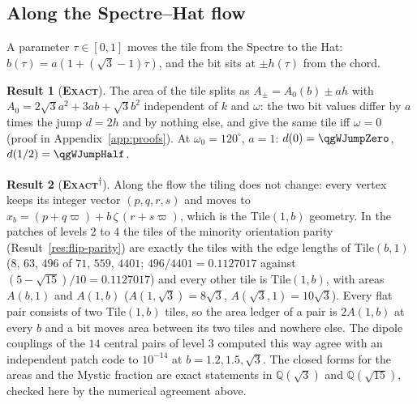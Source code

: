 \documentclass[11pt]{article}
\newcommand{\exact}{\textbf{\textsc{Exact}}}
\newcommand{\snap}{\textsuperscript{$\dagger$}}      %
\theoremstyle{definition}
\newtheorem{result}{Result}
\begin{document}
\subsection{Along the Spectre--Hat flow}\label{sec:flow}
A parameter $\tau\in[0,1]$ moves the tile from the Spectre to the Hat: $b(\tau)=a(1+(\sqrt3-1)\tau)$, and the bit sits at $\pm h(\tau)$ from the chord.
\begin{result}[\exact]\label{res:flow-area}
The area of the tile splits as $A_\pm=A_0(b)\pm ah$ with $A_0=2\sqrt3a^2+3ab+\sqrt3b^2$ independent of $k$ and $\omega$: the two bit values differ by $a$ times the jump $d=2h$ and by nothing else, and give the same tile iff $\omega=0$ (proof in Appendix~\ref{app:proofs}). At $\omega_0=120^\circ$, $a=1$: $d(0)=\qgWJumpZero$, $d(1/2)=\qgWJumpHalf$.
\end{result}
\begin{result}[\exact\snap]\label{res:flow-patch}
Along the flow the tiling does not change: every vertex keeps its integer vector $(p,q,r,s)$ and moves to $x_b=(p+q\varpi)+b\,\zeta\,(r+s\varpi)$, which is the Tile$(1,b)$ geometry. In the patches of levels $2$ to $4$ the tiles of the minority orientation parity (Result~\ref{res:flip-parity}) are exactly the tiles with the edge lengths of Tile$(b,1)$ ($8$, $63$, $496$ of $71$, $559$, $4401$; $496/4401=0.1127017$ against $(5-\sqrt{15})/10=0.1127017$) and every other tile is Tile$(1,b)$, with areas $A(b,1)$ and $A(1,b)$ ($A(1,\sqrt3)=8\sqrt3$, $A(\sqrt3,1)=10\sqrt3$). Every flat pair consists of two Tile$(1,b)$ tiles, so the area ledger of a pair is $2A(1,b)$ at every $b$ and a bit moves area between its two tiles and nowhere else. The dipole couplings of the $14$ central pairs of level $3$ computed this way agree with an independent patch code to $10^{-14}$ at $b=1.2,1.5,\sqrt3$. The closed forms for the areas and the Mystic fraction are exact statements in $\mathbb{Q}(\sqrt3)$ and $\mathbb{Q}(\sqrt{15})$, checked here by the numerical agreement above.
\end{result}
\end{document}
